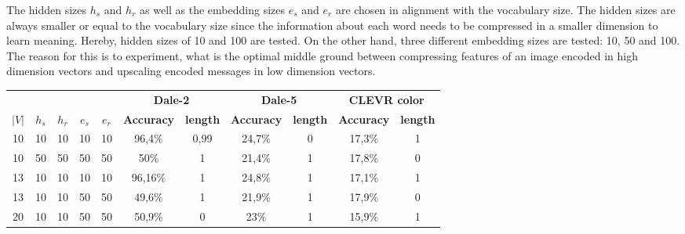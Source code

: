 The hidden sizes $h_s$ and $h_r$ as well as the embedding sizes $e_s$ and $e_r$ are chosen in alignment with the vocabulary size.
The hidden sizes are always smaller or equal to the vocabulary size since the information about each word needs to be compressed in a smaller dimension to learn meaning.
Hereby, hidden sizes of 10 and 100 are tested.
On the other hand, three different embedding sizes are tested: 10, 50 and 100.
The reason for this is to experiment, what is the optimal middle ground between compressing features of an image encoded in high dimension vectors and upscaling encoded messages in low dimension vectors.

\begin{table}[h]
    \centering
    \begin{tabular}{ccccc|cc|cc|cc}
        \toprule
              &         &         &         &         & \multicolumn{2}{c}{\textbf{Dale-2}} & \multicolumn{2}{c}{\textbf{Dale-5}} & \multicolumn{2}{c}{\textbf{CLEVR color}}                                                         \\\cmidrule(lr){6-7}\cmidrule(lr){8-9}\cmidrule(lr){10-11}
        $|V|$ & $h_{s}$ & $h_{r}$ & $e_{s}$ & $e_{r}$ & \textbf{Accuracy}                   & \textbf{length}                     & \textbf{Accuracy}                        & \textbf{length} & \textbf{Accuracy} & \textbf{length} \\\midrule
        {10}  & {10}    & {10}    & {10}    & {10}    & {96,4\%}                            & {0,99}                              & {24,7\%}                                 & {0}             & {17,3\%}          & {1}             \\
        {10}  & {50}    & {50}    & {50}    & {50}    & {50\%}                              & {1}                                 & {21,4\%}                                 & {1}             & {17,8\%}          & {0}             \\
        {13}  & {10}    & {10}    & {10}    & {10}    & {96,16\%}                           & {1}                                 & {24,8\%}                                 & {1}             & {17,1\%}          & {1}             \\
        {13}  & {10}    & {10}    & {50}    & {50}    & {49,6\%}                            & {1}                                 & {21,9\%}                                 & {1}             & {17,9\%}          & {0}             \\
        {20}  & {10}    & {10}    & {50}    & {50}    & {50,9\%}                            & {0}                                 & {23\%}                                   & {1}             & {15,9\%}          & {1}             \\

\end{tabular}
\end{table}
